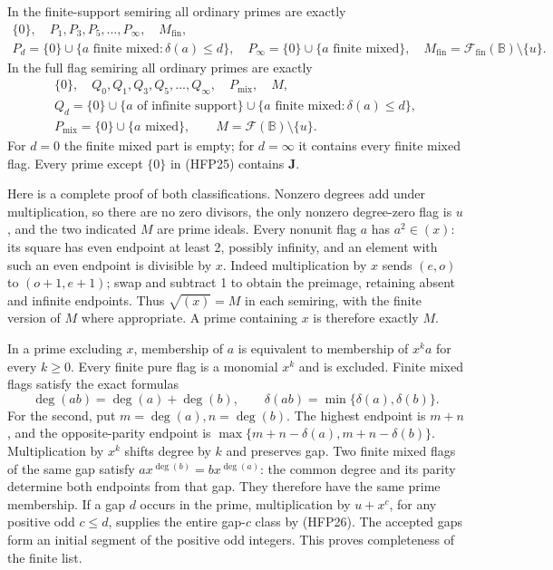 In the finite-support semiring all ordinary primes are exactly
\begin{equation}\tag{HFP24}
\begin{gathered}
 \{0\},\quad P_1,P_3,P_5,\ldots,P_\infty,
                         \quad M_{\mathrm{fin}},\\
 P_d=\{0\}\cup\{a\text{ finite mixed}:\delta(a)\le d\},\quad
 P_\infty=\{0\}\cup\{a\text{ finite mixed}\},\quad
 M_{\mathrm{fin}}=\mathcal F_{\mathrm{fin}}(\mathbb B)\setminus\{u\}.
\end{gathered}
\end{equation}
In the full flag semiring all ordinary primes are exactly
\begin{equation}\tag{HFP25}
\begin{gathered}
 \{0\},\quad Q_0,Q_1,Q_3,Q_5,\ldots,Q_\infty,
                           \quad P_{\mathrm{mix}},\quad M,\\
 Q_d=\{0\}\cup\{a\text{ of infinite support}\}
             \cup\{a\text{ finite mixed}:\delta(a)\le d\},\\
 P_{\mathrm{mix}}=\{0\}\cup\{a\text{ mixed}\},\qquad
 M=\mathcal F(\mathbb B)\setminus\{u\}.
\end{gathered}
\end{equation}
For $d=0$ the finite mixed part is empty; for $d=\infty$
it contains every finite mixed flag. Every prime except
$\{0\}$ in (HFP25) contains $\mathbf J$.

Here is a complete proof of both classifications. Nonzero
degrees add under multiplication, so there are no zero
divisors, the only nonzero degree-zero flag is $u$, and
the two indicated $M$ are prime ideals. Every nonunit
flag $a$ has $a^2\in(x)$: its square has even endpoint
at least 2, possibly infinity, and an element with such
an even endpoint is divisible by $x$. Indeed multiplication
by $x$ sends $(e,o)$ to $(o+1,e+1)$; swap and subtract
1 to obtain the preimage, retaining absent and infinite
endpoints. Thus $\sqrt{(x)}=M$ in each semiring, with the
finite version of $M$ where appropriate. A prime containing
$x$ is therefore exactly $M$.

In a prime excluding $x$, membership of $a$ is equivalent
to membership of $x^ka$ for every $k\ge0$. Every finite
pure flag is a monomial $x^k$ and is excluded. Finite mixed
flags satisfy the exact formulas
\begin{equation}\tag{HFP26}
 \deg(ab)=\deg(a)+\deg(b),\qquad
 \delta(ab)=\min\{\delta(a),\delta(b)\}.
\end{equation}
For the second, put $m=\deg(a),n=\deg(b)$. The highest
endpoint is $m+n$, and the opposite-parity endpoint is
$\max\{m+n-\delta(a),m+n-\delta(b)\}$.
Multiplication by $x^k$ shifts degree by $k$ and preserves
gap. Two finite mixed flags of the same gap satisfy
$ax^{\deg(b)}=bx^{\deg(a)}$: the common degree and its
parity determine both endpoints from that gap. They
therefore have the same prime membership. If a gap $d$
occurs in the prime, multiplication by $u+x^c$, for any
positive odd $c\le d$, supplies the entire gap-$c$ class
by (HFP26). The accepted gaps form an initial segment of
the positive odd integers. This proves completeness of
the finite list.

